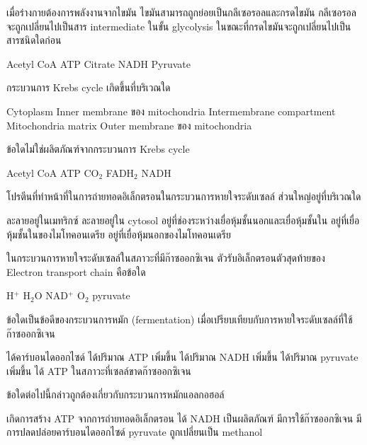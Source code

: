 \begin{questions}
\filbreak
  \question เมื่อร่างกายต้องการพลังงานจากไขมัน ไขมันสามารถถูกย่อยเป็นกลีเซอรอลและกรดไขมัน กลีเซอรอลจะถูกเปลี่ยนไปเป็นสาร intermediate ในขั้น glycolysis ในขณะที่กรดไขมันจะถูกเปลี่ยนไปเป็นสารชนิดใดก่อน
  \begin{choices}
    \choice Acetyl CoA
    \choice ATP
    \choice Citrate
    \choice NADH
    \choice Pyruvate
\end{choices}

\filbreak
  \question กระบวนการ Krebs cycle เกิดขึ้นที่บริเวณใด
  \begin{choices}
    \choice Cytoplasm
    \choice Inner membrane ของ mitochondria
    \choice Intermembrane compartment
    \choice Mitochondria matrix
    \choice Outer membrane ของ mitochondria
\end{choices}

\filbreak
  \question ข้อใดไม่ใช่ผลิตภัณฑ์จากกระบวนการ Krebs cycle
  \begin{choices}
    \choice Acetyl CoA
    \choice ATP
    \choice CO$_2$
    \choice FADH$_2$
    \choice NADH
\end{choices}

\filbreak
  \question โปรตีนที่ทำหน้าที่ในการถ่ายทอดอิเล็กตรอนในกระบวนการหายใจระดับเซลล์ ส่วนใหญ่อยู่ที่บริเวณใด
  \begin{choices}
    \choice ละลายอยู่ในเมทริกซ์
    \choice ละลายอยู่ใน cytosol
    \choice อยู่ที่ช่องระหว่างเยื่อหุ้มชั้นนอกและเยื่อหุ้มชั้นใน
    \choice อยู่ที่เยื่อหุ้มชั้นในของไมโทคอนเดรีย
    \choice อยู่ที่เยื่อหุ้มนอกของไมโทคอนเดรีย
\end{choices}

\filbreak
  \question ในกระบวนการหายใจระดับเซลล์ในสภาวะที่มีก๊าซออกซิเจน ตัวรับอิเล็กตรอนตัวสุดท้ายของ Electron transport chain คือข้อใด
  \begin{choices}
    \choice H$^+$
    \choice H$_2$O
    \choice NAD$^+$
    \choice O$_2$
    \choice pyruvate
\end{choices}

\filbreak
  \question ข้อใดเป็นข้อดีของกระบวนการหมัก (fermentation) เมื่อเปรียบเทียบกับการหายใจระดับเซลล์ที่ใช้ก๊าซออกซิเจน
  \begin{choices}
    \choice ได้คาร์บอนไดออกไซด์
    \choice ได้ปริมาณ ATP เพิ่มขึ้น
    \choice ได้ปริมาณ NADH เพิ่มขึ้น
    \choice ได้ปริมาณ pyruvate เพิ่มขึ้น
    \choice ได้ ATP ในสภาวะที่เซลล์ขาดก๊าซออกซิเจน
\end{choices}

\filbreak
  \question ข้อใดต่อไปนี้กล่าวถูกต้องเกี่ยวกับกระบวนการหมักแอลกอฮอล์
  \begin{choices}
    \choice เกิดการสร้าง ATP จากการถ่ายทอดอิเล็กตรอน
    \choice ได้ NADH เป็นผลิตภัณฑ์
    \choice มีการใช้ก๊าซออกซิเจน
    \choice มีการปลดปล่อยคาร์บอนไดออกไซด์
    \choice pyruvate ถูกเปลี่ยนเป็น methanol
\end{choices}

\end{questions}